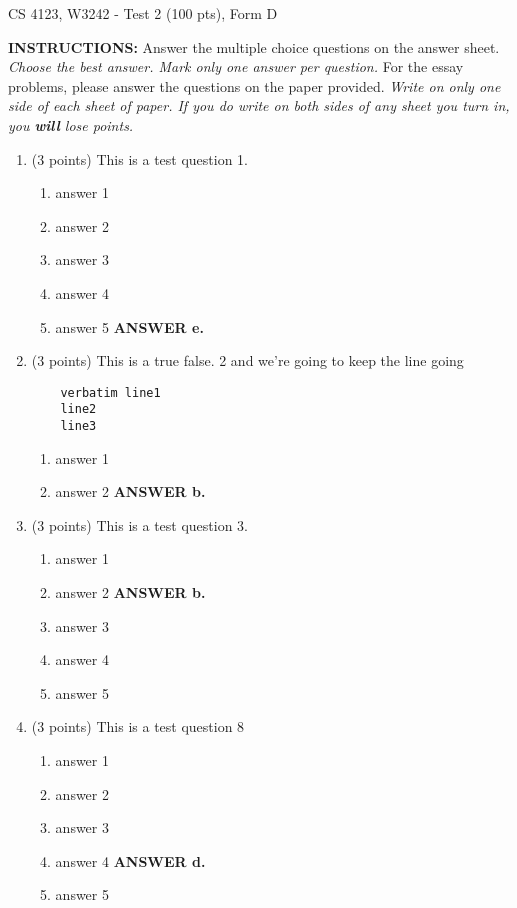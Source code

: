 \documentclass{article}
\newcommand{\ans}[1]{ \ifnum\showans=1 {\bf ANSWER #1.} \fi }
\begin{document}
{ \Large
\begin{center}
CS 4123, W3242 - Test 2 (100 pts), Form D
\end{center}
}

\vspace{.1in}

\noindent
{\Large\bf INSTRUCTIONS:} Answer the multiple choice questions on the
answer sheet.  {\em Choose the best answer.  Mark only one answer per
question.}  For the essay problems, please answer the questions on the
paper provided.  {\em Write on only one side of each sheet of paper.
If you do write on both sides of any sheet you turn in, you {\bf will}
lose points.}

\vspace{.1in}

\begin{enumerate}

\item (3 points) This is a test question 1.
  \begin{enumerate}
  \item answer 1
  \item answer 2
  \item answer 3
  \item answer 4
  \item answer 5  \ans{e}
  \end{enumerate}

\item (3 points) This is a true false. 2
and we're going to keep the line going
\begin{verbatim}
    verbatim line1
    line2
    line3
\end{verbatim}
  \begin{enumerate}
  \item answer 1
  \item answer 2  \ans{b}
  \end{enumerate}

\item (3 points) This is a test question 3.
  \begin{enumerate}
  \item answer 1
  \item answer 2  \ans{b}
  \item answer 3
  \item answer 4
  \item answer 5
  \end{enumerate}

\item (3 points) This is a test question 8
  \begin{enumerate}
  \item answer 1
  \item answer 2
  \item answer 3
  \item answer 4  \ans{d}
  \item answer 5
  \end{enumerate}


\end{enumerate}
\end{document}
